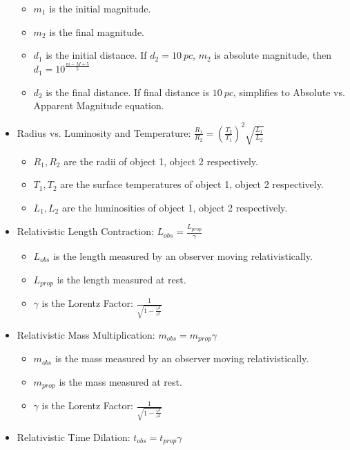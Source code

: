 \documentclass[letterpaper,14pt]{extarticle}
\begin{document}
\begin{itemize}
    \begin{itemize}
        \item $m_1$ is the initial magnitude.
        \item $m_2$ is the final magnitude.
        \item $d_1$ is the initial distance. If $d_2 = 10\ pc$, $m_2$ is absolute magnitude, then
        \newline 
        $d_1 = 10^{\frac{m - M + 5}{5}}$
        \item $d_2$ is the final distance. If final distance is $10\ pc$, simplifies to Absolute vs. Apparent Magnitude equation.
    \end{itemize}
    \pagebreak
    \item Radius vs. Luminosity and Temperature: $\frac{R_1}{R_2} = (\frac{T_2}{T_1})^2 \sqrt{\frac{L_1}{L_2}}$
    \begin{itemize}
        \item $R_1, R_2$ are the radii of object 1, object 2 respectively.
        \item $T_1, T_2$ are the surface temperatures of object 1, object 2 respectively.
        \item $L_1, L_2$ are the luminosities of object 1, object 2 respectively.
    \end{itemize}
    \item Relativistic Length Contraction: $L_{obs} = \frac{L_{prop}}{\gamma}$
    \begin{itemize}
        \item $L_{obs}$ is the length measured by an observer moving relativistically.
        \item $L_{prop}$ is the length measured at rest.
        \item $\gamma$ is the Lorentz Factor: $\frac{1}{\sqrt{1 - \frac{v^2}{c^2}}}$
    \end{itemize}
    \item Relativistic Mass Multiplication: $m_{obs} = m_{prop}\gamma$
    \begin{itemize}
        \item $m_{obs}$ is the mass measured by an observer moving relativistically.
        \item $m_{prop}$ is the mass measured at rest.
        \item $\gamma$ is the Lorentz Factor: $\frac{1}{\sqrt{1 - \frac{v^2}{c^2}}}$
    \end{itemize}
    \item Relativistic Time Dilation: $t_{obs} = t_{prop}\gamma$

\end{itemize}
\end{document}
